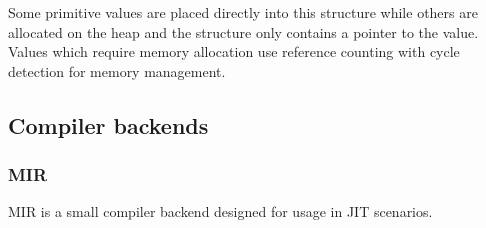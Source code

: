 Some primitive values are placed directly into this structure while others are allocated on the heap and the structure only contains a pointer to the value. Values which require memory allocation use reference counting with cycle detection for memory management.



\subsection{Compiler backends}


\subsubsection{MIR}

MIR is a small compiler backend designed for usage in JIT scenarios.
